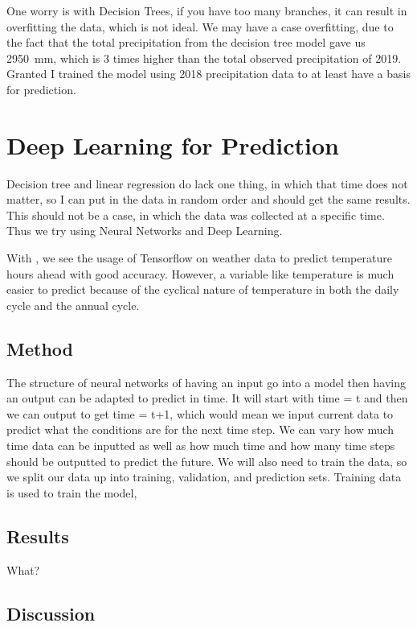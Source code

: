 \documentclass[11pt]{report}
\begin{document}
One worry is with Decision Trees, if you have too many branches, it can
result in overfitting the data, which is not ideal. We may have a case
overfitting, due to the fact that the total precipitation from the decision
tree model gave us 2950~mm, which is 3 times higher than the total observed
precipitation of 2019. Granted I trained the model using 2018 precipitation
data to at least have a basis for prediction.

\clearpage

\section{Deep Learning for Prediction}\label{sec:neural}

Decision tree and linear regression do lack one thing, in which that time does not matter, so I can put in the data in random order and should get the same results. This should not be a case, in which the data was collected at a specific time. Thus we try using Neural Networks and Deep Learning. 

With \cite{Norway}, we see the usage of Tensorflow on weather data to 
predict temperature hours ahead with good accuracy. However, a variable like temperature is much easier to predict because of the cyclical nature of temperature in both the daily cycle and the annual cycle.  
\subsection{Method}
The structure of neural networks of having an input go into a model then having an output can be adapted to predict in time. It will start with time = t and then we can output to get time = t+1, which would mean we input current data to predict what the conditions are for the next time step. We can vary how much time data can be inputted as well as how much time and how many time steps should be outputted to predict the future. We will also need to train the data, so we split our data up into training, validation, and prediction sets. Training data is used to train the model,



\subsection{Results}

What?

\subsection{Discussion}
\end{document}
